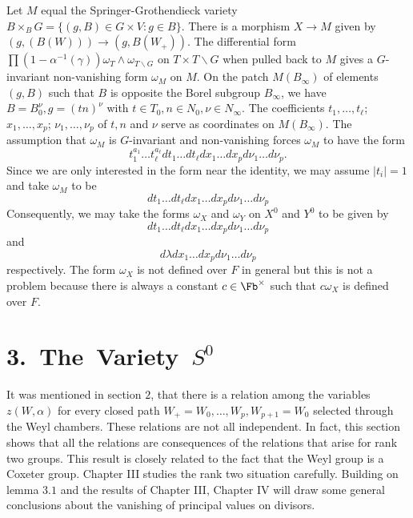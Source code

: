 \documentclass{memo-l}
\theoremstyle{definition}
\theoremstyle{remark}
\numberwithin{section}{chapter}
\numberwithin{equation}{chapter}
\begin{document}
Let $M$ equal the Springer-Grothendieck variety $B \times_{B}G = \{(g,B) \in
G \times V : g \in B\}$.
 There is a morphism $X {\to} M$ given by $(g,(B(W))) {\to} (g,B(W_{+}))$.
 The differential form $\prod (1-{\alpha}^{-1}({\gamma})){\omega}_{T}
\wedge
{\omega}_{T\backslash G}$ on $T \times T\backslash G$ when pulled back to $M$ gives a
$G$-invariant non-vanishing form ${\omega}_{M}$ on $M$.
 On the patch $M(B_{{\infty}})$ of elements $(g,B)$ such that $B$ is opposite
the Borel subgroup $B_{{\infty}}$, we have $B = B_{0}^{{\nu}}, g =
(tn)^{{\nu}}$ with $t \in T_{0}, n \in N_{0}, {\nu} \in N_{{\infty}}$.
 The coefficients $t_{1},\ldots ,t_\ell$; $x_1,\ldots ,x_p$;
$\nu_1, \ldots ,\nu_p$ of ${t}, {n}$ and ${{\nu}}$ serve as coordinates on
$M(B_{{\infty}})$.
 The assumption that ${\omega}_{M}$ is $G$-invariant and non-vanishing
forces ${\omega}_{M}$ to have the form
$$
t_{1}^{a_1} \ldots t_{\ell}^{a_\ell} dt_{1}\ldots
dt_{{\ell}}dx_{1} \ldots dx_{p}d{\nu}_{1}\ldots d{\nu}_{p} .
$$
Since we are only interested in the form near the identity, we may assume
$\vert t_{i}\vert =1$ and take ${\omega}_{M}$ to be
$$
dt_1\ldots dt_\ell dx_1 \ldots dx_p d\nu_1\ldots d\nu_p
$$
Consequently, we may take the forms ${\omega}_{X}$ and ${\omega}_{Y}$ on
$X^{0}$ and $Y^{0}$ to be given by
$$
dt_{1}\ldots dt_{{\ell}}dx_{1}\ldots dx_{p}d{\nu}_{1}\ldots d{\nu}_{p}
$$
and
$$
d{\lambda}dx_{1}\ldots dx_{p}d{\nu}_{1}\ldots d{\nu}_{p}
$$
respectively.  The form ${\omega}_{X}$ is not defined over $F$
in general but this is not a problem because there is always a
constant $c \in \Fb^{\times}$ such that $c{\omega}_{X}$ is defined over $F$.

\section{{3.\  The\ Variety\ $S^0$}}   

   It was mentioned in section $2$, that there is a relation among the
variables $z(W,{\alpha})$ for every closed path $W_{+}=W_{0},\ldots ,
W_{p},W_{p+1}=W_{0}$ selected through the Weyl chambers.
 These relations are not all independent.
 In fact, this section shows that all the relations are consequences of
the relations that arise for rank two groups.
 This result is closely related to the fact that the Weyl group is a
Coxeter group.
 Chapter III studies the rank two situation carefully.
 Building on lemma $3.1$ and the results of Chapter III, Chapter IV will
draw some general conclusions about the vanishing of principal values on
divisors.
\end{document}
